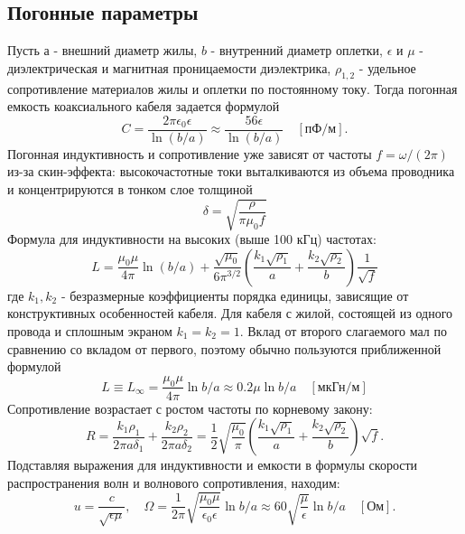 \documentclass[a4paper,14pt]{extarticle}
\begin{document}
	\subsection{Погонные параметры}
		Пусть $а$ - внешний диаметр жилы, $b$ - внутренний диаметр оплетки, $\epsilon$ и $\mu$ - диэлектрическая и магнитная проницаемости диэлектрика, $\rho_{1,2}$ - удельное сопротивление материалов жилы и оплетки по постоянному току. Тогда погонная емкость коаксиального кабеля задается формулой
		\begin{equation}
			C = \frac{2 \pi \epsilon_0 \epsilon}{\ln(b / a)} \approx \frac{56 \epsilon}{\ln(b / a)} \quad [\text{пФ/м}].
		\end{equation}
		Погонная индуктивность и сопротивление уже зависят от частоты $f = \omega / (2 \pi)$ из-за скин-эффекта: высокочастотные токи выталкиваются из объема проводника и концентрируются в тонком слое толщиной
		\begin{equation}
			\delta = \sqrt{\frac{\rho}{\pi \mu_0 f}}
		\end{equation}
		Формула для индуктивности на высоких (выше 100 кГц) частотах:
		\begin{equation}
			L = \frac{\mu_0 \mu}{4 \pi} \ln(b / a) + \frac{\sqrt{\mu_0}}{6 \pi^{3/2}} (\frac{k_1 \sqrt{\rho_1}}{a} + \frac{k_2 \sqrt{\rho_2}}{b}) \frac{1}{\sqrt{f}}
		\end{equation}
		где $k_1, k_2$ - безразмерные коэффициенты порядка единицы, зависящие от конструктивных особенностей кабеля. Для кабеля с жилой, состоящей из одного провода и сплошным экраном $k_1 = k_2 = 1$. Вклад от второго слагаемого мал по сравнению со вкладом от первого, поэтому обычно пользуются приближенной формулой
		\begin{equation}
			L \equiv L_{\infty} = \frac{\mu_0 \mu}{4 \pi} \ln{b / a} \approx 0.2 \mu \ln{b / a} \quad[\text{мкГн/м}]
		\end{equation}
		Сопротивление возрастает с ростом частоты по корневому закону:
		\begin{equation}
			R = \frac{k_1 \rho_1}{2 \pi a \delta_1} + \frac{k_2 \rho_2}{2 \pi a \delta_2} = \frac{1}{2} \sqrt{\frac{\mu_0}{\pi}} (\frac{k_1 \sqrt{\rho_1}}{a} + \frac{k_2 \sqrt{\rho_2}}{b}) \sqrt{f}.
		\end{equation}
		Подставляя выражения для индуктивности и емкости в формулы скорости распространения волн и волнового сопротивления, находим:
		\begin{equation}
			u = \frac{c}{\sqrt{\epsilon \mu}}, \quad \Omega = \frac{1}{2 \pi} \sqrt{\frac{\mu_0 \mu}{\epsilon_0 \epsilon}} \ln{b / a} \approx 60 \sqrt{\frac{\mu}{\epsilon}} \ln{b / a} \quad[\text{Ом}].
		\end{equation}
\end{document}
